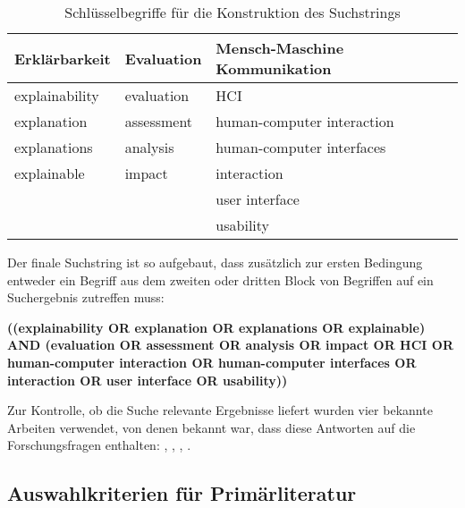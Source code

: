 \begin{table}[htb!]
    \begin{tabular}{p{}p{}p{}}
        \hline
        Erklärbarkeit  & Evaluation & Mensch-Maschine Kommunikation             \\
        \toprule
        explainability          & evaluation    & HCI                           \\
        explanation             & assessment    & human-computer interaction    \\
        explanations            & analysis      & human-computer interfaces     \\
        explainable             & impact        & interaction                   \\
                                &               & user interface                \\
                                &               & usability                     \\              
        \toprule
    \end{tabular}
\caption{Schlüsselbegriffe für die Konstruktion des Suchstrings}
\label{tab:search_terms}
\end{table}

Der finale Suchstring ist so aufgebaut, dass zusätzlich zur ersten Bedingung entweder ein Begriff aus dem zweiten oder dritten Block von Begriffen auf ein Suchergebnis zutreffen muss:

\bigskip

\noindent\textbf{((explainability OR explanation OR explanations OR explainable) AND (evaluation OR assessment OR analysis OR impact OR HCI OR \glqq human-computer interaction\grqq{} OR \glqq human-computer interfaces \grqq{} OR interaction OR \glqq user interface\grqq{} OR usability))}

\bigskip

Zur Kontrolle, ob die Suche relevante Ergebnisse liefert wurden vier bekannte Arbeiten verwendet, von denen bekannt war, dass diese Antworten auf die Forschungsfragen enthalten: \citeauthor{chazette_end-users_nodate} \cite{chazette_end-users_nodate}, \citeauthor{chazette2020explainability} \cite{chazette2020explainability}, \citeauthor{kohl_explainability_2019} \cite{kohl_explainability_2019}, \citeauthor{sokol_explainability_2020} \cite{sokol_explainability_2020}.

\subsection{Auswahlkriterien für Primärliteratur}

